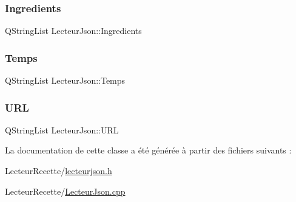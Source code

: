 \mbox{\label{class_lecteur_json_a0648021cfe10db3555625e63c14961f9}} 
\subsubsection{\texorpdfstring{Ingredients}{Ingredients}}
{\footnotesize\ttfamily Q\+String\+List Lecteur\+Json\+::\+Ingredients\hspace{0.3cm}{\ttfamily [private]}}

\mbox{\label{class_lecteur_json_a46972b215d8f7d30f68e7cf9c5711fc1}} 
\subsubsection{\texorpdfstring{Temps}{Temps}}
{\footnotesize\ttfamily Q\+String\+List Lecteur\+Json\+::\+Temps\hspace{0.3cm}{\ttfamily [private]}}

\mbox{\label{class_lecteur_json_ac4e3585c5c083c669273346ac6910353}} 
\subsubsection{\texorpdfstring{U\+RL}{URL}}
{\footnotesize\ttfamily Q\+String\+List Lecteur\+Json\+::\+U\+RL\hspace{0.3cm}{\ttfamily [private]}}



La documentation de cette classe a été générée à partir des fichiers suivants \+:\begin{DoxyCompactItemize}
\item 
Lecteur\+Recette/\hyperlink{lecteurjson_8h}{lecteurjson.\+h}\item 
Lecteur\+Recette/\hyperlink{_lecteur_json_8cpp}{Lecteur\+Json.\+cpp}\end{DoxyCompactItemize}
